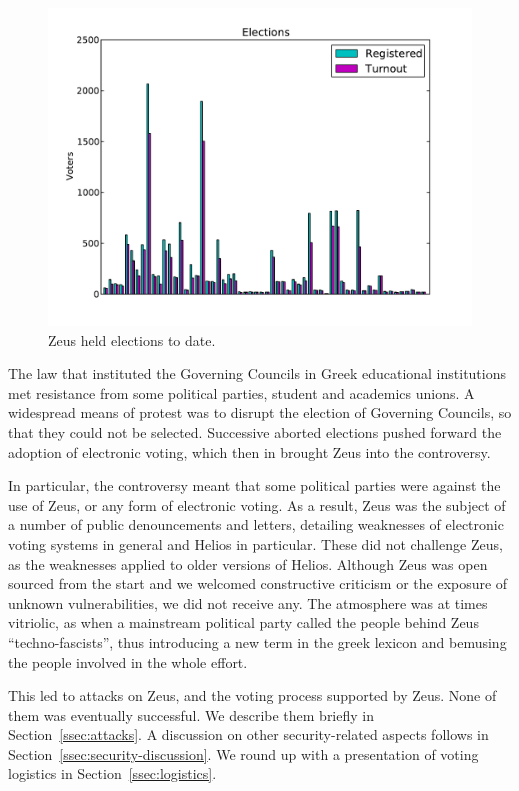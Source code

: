 \documentclass[letterpaper,10pt]{article}
\begin{document}
\begin{figure}[ht]
  \begin{center}
    \includegraphics[scale=0.7]{elections_to_date.pdf}
  \end{center}
  \caption{Zeus held elections to date.}
  \label{fig:elections_to_date}
\end{figure}

The law that instituted the Governing Councils in Greek educational
institutions met resistance from some political parties, student and
academics unions. A widespread means of protest was to disrupt the
election of Governing Councils, so that they could not be selected.
Successive aborted elections pushed forward the adoption of electronic
voting, which then in brought Zeus into the controversy. 

In particular, the controversy meant that some political parties were
against the use of Zeus, or any form of electronic voting. As a
result, Zeus was the subject of a number of public denouncements and
letters, detailing weaknesses of electronic voting systems in general
and Helios in particular. These did not challenge Zeus, as the
weaknesses applied to older versions of Helios. Although Zeus was open
sourced from the start and we welcomed constructive criticism or the
exposure of unknown vulnerabilities, we did not receive any. The
atmosphere was at times vitriolic, as when a mainstream political
party called the people behind Zeus ``techno-fascists'', thus
introducing a new term in the greek lexicon and bemusing the people
involved in the whole effort.

This led to attacks on Zeus, and the voting process supported by Zeus.
None of them was eventually successful. We describe them briefly in
Section~\ref{ssec:attacks}. A discussion on other security-related
aspects follows in Section~\ref{ssec:security-discussion}. We round up
with a presentation of voting logistics in
Section~\ref{ssec:logistics}.
\end{document}
